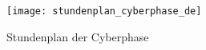 \thispagestyle{empty}

\begin{figure}
    \centering
    \texttt{[image: stundenplan\_cyberphase\_de]}
    \caption{Stundenplan der Cyberphase}
\end{figure}

\cleardoublepage
